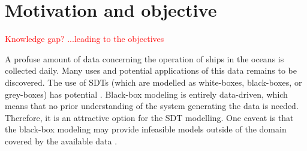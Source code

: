 %    
%
%
%






\section{Motivation and objective}
\label{sec:motivation}
\textcolor{red}{Knowledge gap? ...leading to the objectives}


A profuse amount of data concerning the operation of ships in the oceans is collected daily. Many uses and potential applications of this data remains to be discovered. The use of SDTs (which are modelled as white-boxes, black-boxes, or grey-boxes) has potential .
Black-box modeling is entirely data-driven, which means that no prior understanding of the system generating the data is needed. Therefore, it is an attractive option for the SDT modelling. One caveat is that the black-box modeling may provide infeasible models outside of the domain covered by the available data \cite{nielsen_machine_2022}. 

